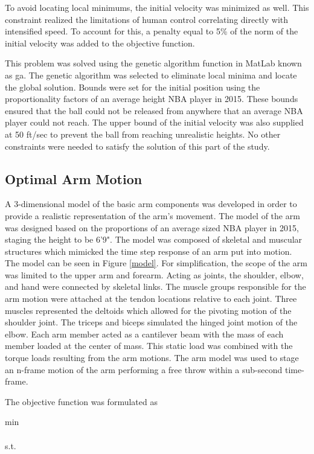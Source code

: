 \begin{multicols}{2}
To avoid locating local minimums, the initial velocity was minimized as well.  This constraint realized the limitations of human control correlating directly with intensified speed.  To account for this, a penalty equal to 5\% of the norm of the initial velocity was added to the objective function.

This problem was solved using the genetic algorithm function in MatLab known as ga. The genetic algorithm was selected to eliminate local minima and locate the global solution. Bounds were set for the initial position using the proportionality factors of an average height NBA player in 2015. These bounds ensured that the ball could not be released  from anywhere that an average NBA player could not reach. The upper bound of the initial velocity was also supplied at 50 ft/sec to prevent the ball from reaching unrealistic heights.  No other constraints were needed to satisfy the solution of this part of the study.  

\subsection*{Optimal Arm Motion}
A 3-dimensional model of the basic arm components was developed in order to provide a realistic representation of the arm's movement.  The model of the arm was designed based on the proportions of an average sized NBA player in 2015, staging the height to be 6'9".  The model was composed of skeletal and muscular structures which mimicked the time step response of an arm put into motion.  The model can be seen in Figure \ref{model}. For simplification, the scope of the arm was limited to the upper arm and forearm.  Acting as joints, the shoulder, elbow, and hand were connected by skeletal links.  The muscle groups responsible for the arm motion were attached at the tendon locations relative to each joint.  Three muscles represented the deltoids which allowed for the pivoting motion of the shoulder joint.  The triceps and biceps simulated the hinged joint motion of the elbow.  Each arm member acted as a cantilever beam with the mass of each member loaded at the center of mass.  This static load was combined with the torque loads resulting from the arm motions.  The arm model was used to stage an n-frame motion of the arm performing a free throw within a sub-second time-frame.

The objective function was formulated as 

\begin{minipage}[t]{.2\linewidth}
\begin{flushright}
min\\
~\\
s.t.\\
\end{flushright}


\end{minipage}
\end{multicols}
